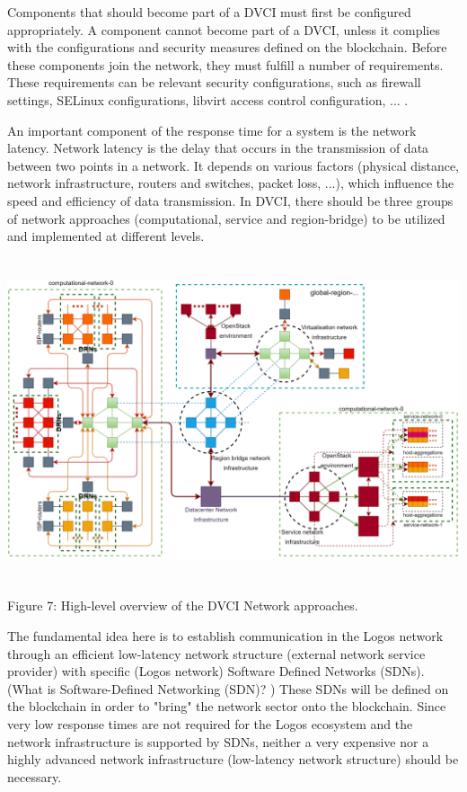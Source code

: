 \documentclass[]{article}
\begin{document}
Components that should become part of a DVCI must first be configured appropriately. 
A component cannot become part of a DVCI, unless it complies with the configurations and security measures defined on the blockchain. 
Before these components join the network, they must fulfill a number of requirements.
These requirements can be relevant security configurations, such as firewall settings, SELinux configurations, libvirt access control configuration, ... .

An important component of the response time for a system is the network latency.
Network latency is the delay that occurs in the transmission of data between two points in a network. 
It depends on various factors (physical distance, network infrastructure, routers and switches, packet loss, ...), which influence the speed and efficiency of data transmission.
In DVCI, there should be three groups of network approaches (computational, service and region-bridge) to be utilized and implemented at different levels.
 
\begin{center}
	\includegraphics[height=9.5cm]{dvci-network-overview}
\end{center}
\begin{center}
	Figure 7: High-level overview of the DVCI Network approaches.
\end{center}

The fundamental idea here is to establish communication in the Logos network through an efficient low-latency network structure (external network service provider) with specific (Logos network) Software Defined Networks (SDNs). (What is Software-Defined Networking (SDN)? \cite{VMwareDoc-sdn})
These SDNs will be defined on the blockchain in order to "bring" the network sector onto the blockchain.
Since very low response times are not required for the Logos ecosystem and the network infrastructure is supported by SDNs, neither a very expensive nor a highly advanced network infrastructure (low-latency network structure) should be necessary.
\newline
\end{document}
